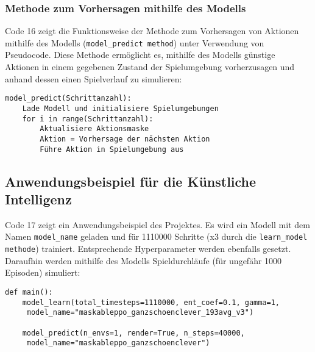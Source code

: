 \subsubsection{Methode zum Vorhersagen mithilfe des Modells}
\begin{minipage}{\linewidth}
Code 16 zeigt die Funktionsweise der Methode zum Vorhersagen von Aktionen mithilfe des Modells (\texttt{model\_predict method}) unter Verwendung von Pseudocode. Diese Methode ermöglicht es, mithilfe des Modells günstige Aktionen in einem gegebenen Zustand der Spielumgebung vorherzusagen und anhand dessen einen Spielverlauf zu simulieren:
\vspace{0.5cm}
\begin{lstlisting}[caption={Methode zum Vorhersagen von Aktionen mithilfe des Modells},morekeywords={Schrittanzahl}]
model_predict(Schrittanzahl):
	Lade Modell und initialisiere Spielumgebungen
	for i in range(Schrittanzahl):
		Aktualisiere Aktionsmaske
		Aktion = Vorhersage der nächsten Aktion
		Führe Aktion in Spielumgebung aus
\end{lstlisting}
\end{minipage}
\subsection{Anwendungsbeispiel für die Künstliche Intelligenz}
\begin{minipage}{\linewidth}
Code 17 zeigt ein Anwendungsbeispiel des Projektes. Es wird ein Modell mit dem Namen \texttt{model\_name} geladen und für 1110000 Schritte (x3 durch die \texttt{learn\_model methode}) trainiert. Entsprechende Hyperparameter werden ebenfalls gesetzt. Daraufhin werden mithilfe des Modells Spieldurchläufe (für ungefähr 1000 Episoden) simuliert:
\vspace{0.5cm}
\begin{lstlisting}[caption={Anwendungsbeispiel für die Künstliche Intelligenz}]
def main():
	model_learn(total_timesteps=1110000, ent_coef=0.1, gamma=1, 
	 model_name="maskableppo_ganzschoenclever_193avg_v3")
	
	model_predict(n_envs=1, render=True, n_steps=40000,
	 model_name="maskableppo_ganzschoenclever")
\end{lstlisting}
\end{minipage}